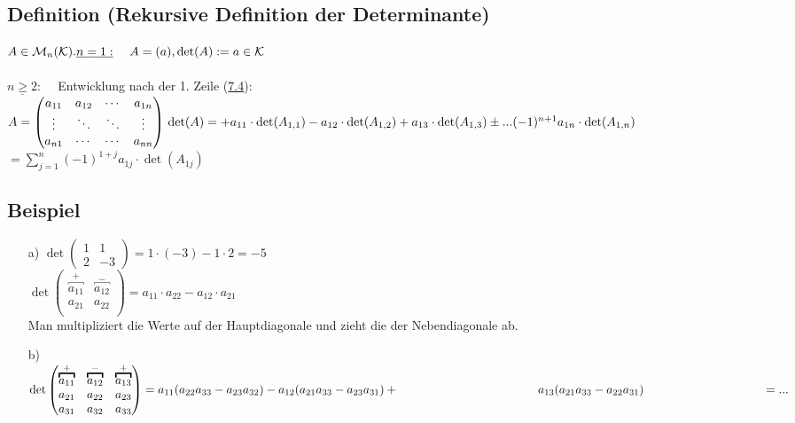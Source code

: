 \documentclass[12pt,titlepage, pdf]{article}
\newcommand{\K}{\mathcal{K}}
\newcommand{\M}{\mathcal{M}}
\renewcommand{\>}{\rightarrow}
\renewcommand{\*}{\cdot}
\begin{document}
\subsection{Definition (Rekursive Definition der Determinante)}
\label{8.2}
$A \in \M_n(\K).\\
\\
\underline{n = 1:} ~~~~A = (a), \det(A) := a \in \K$\\
\\
$\underline{n \geq 2}:~~~~$ Entwicklung nach der 1. Zeile (\hyperref[7.4]{7.4}): \\
$A = \begin{pmatrix}
a_{11} & a_{12} & \cdots & a_{1n} \\
\vdots & \ddots &\ddots & \vdots \\
a_{n1} & \cdots & \cdots & a_{nn} \\
\end{pmatrix}\\ 
\\
\det(A) =+a_{11}\cdot \det(A_{1,1})- a_{12}\cdot \det(A_{1,2}) + a_{13}\cdot \det(A_{1,3}) \pm ... (-1)^{n+1}a_{1n}\cdot \det(A_{1,n})$
\noindent\hspace*{12mm}$= \sum_{j = 1}^{n} (-1)^{1+j} a_{1j} \cdot \det(A_{1j})$
\subsection{Beispiel}
\begin{itemize}
	\item[a)] $\det\begin{pmatrix}
	1 & 1 \\
	2 & -3
	\end{pmatrix} = 1 \cdot (-3) - 1 \cdot 2 = -5$\\
	$\det\begin{pmatrix}
	\overbracket{a_{11}}^{+} & \overbracket{a_{12}}^{-} \\
	a_{21} & a_{22} \\
	\end{pmatrix} = a_{11} \cdot a_{22} - a_{12} \cdot a_{21}$  \\
	 Man multipliziert die Werte auf der Hauptdiagonale und zieht die der Nebendiagonale ab.
	\item[b)] $\det\begin{pmatrix}
	\overbracket{a_{11}}^{+} &\overbracket{a_{12}}^{-} & \overbracket{a_{13}}^{+} \\
	a_{21} &a_{22} & a_{23} \\
	a_{31} &a_{32} & a_{33} \\
	\end{pmatrix} = a_{11}(a_{22}a_{33} - a_{23}a_{32}) - a_{12}(a_{21}a_{33} - a_{23}a_{31}) + \\
	\noindent\hspace*{41mm}a_{13}(a_{21}a_{33} - a_{22}a_{31}) \\\noindent\hspace*{35mm}= ...$\\
\end{itemize}
\end{document}
